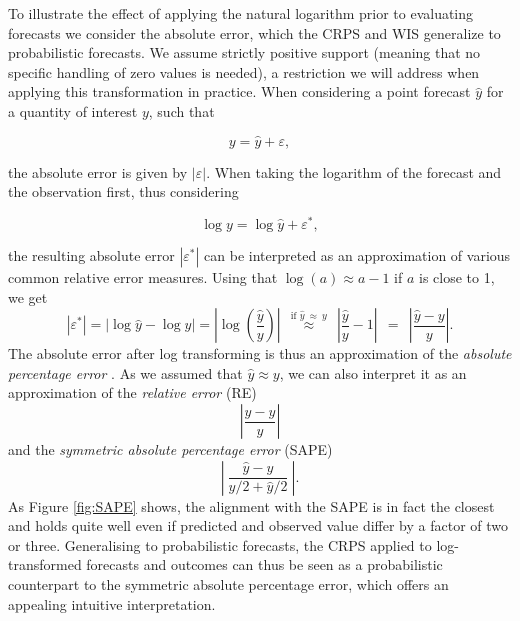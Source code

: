 \documentclass{article}
\begin{document}
To illustrate the effect of applying the natural logarithm prior to evaluating forecasts we consider the absolute error, which the CRPS and WIS generalize to probabilistic forecasts. We assume strictly positive support (meaning that no specific handling of zero values is needed), a restriction we will address when applying this transformation in practice. When considering a point forecast $\hat{y}$ for a quantity of interest $y$, such that 
%
\begin{linenomath*}
\begin{equation*}
y = \hat{y} + \varepsilon,
\end{equation*}
\end{linenomath*}
the absolute error is given by $|\varepsilon|$. When taking the logarithm of the forecast and the observation first, thus considering 
\begin{linenomath*}
\begin{equation*}
\log y = \log \hat{y} + \varepsilon^*,
\end{equation*}
\end{linenomath*}
the resulting absolute error $\left|\varepsilon^*\right|$ can be interpreted as an approximation of various common relative error measures. Using that $\log(a) \approx a - 1$ if $a$ is close to 1, we get
$$
|\varepsilon^*| = |\log \hat{y} - \log y| = \left|\log\left(\frac{\hat{y}}{y}\right) \right| \ \ \stackrel{\text{if } \hat{y} \ \approx \ y}{\approx} \ \ \left| \frac{\hat{y}}{y} - 1 \right| \ \ = \ \ \left| \frac{\hat{y} - y}{y} \right|.
$$
The absolute error after log transforming is thus an approximation of the \textit{absolute percentage error} \citep[APE,][]{gneitingMakingEvaluatingPoint2011a}. As we assumed that $\hat{y} \approx y$, we can also interpret it as an approximation of the \textit{relative error} (RE)
$$
\left| \frac{\hat{y} - y}{\hat{y}} \right|
$$
and the \textit{symmetric absolute percentage error} (SAPE)
$$
\left| \ \frac{\hat{y} - y}{y/2 + \hat{y}/2} \ \right|.
$$
As Figure \ref{fig:SAPE} shows, the alignment with the SAPE is in fact the closest and holds quite well even if predicted and observed value differ by a factor of two or three. Generalising to probabilistic forecasts, the CRPS applied to log-transformed forecasts and outcomes can thus be seen as a probabilistic counterpart to the symmetric absolute percentage error, which offers an appealing intuitive interpretation.
\end{document}
